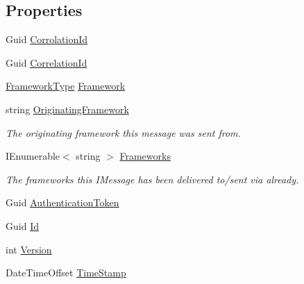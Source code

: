 \subsection*{Properties}
\begin{DoxyCompactItemize}
\item 
Guid \hyperlink{classCqrs_1_1Akka_1_1Tests_1_1Unit_1_1Events_1_1HelloWorldSaid_aa6b7af3e0cd38f63f65dd7d23e1ec628}{Corrolation\+Id}
\item 
Guid \hyperlink{classCqrs_1_1Akka_1_1Tests_1_1Unit_1_1Events_1_1HelloWorldSaid_a73d702957bb698206b0fd3a6ed3adf99}{Correlation\+Id}
\item 
\hyperlink{namespaceCqrs_1_1Messages_af06a7e6cd2609043d0f2f5f3419f81e3}{Framework\+Type} \hyperlink{classCqrs_1_1Akka_1_1Tests_1_1Unit_1_1Events_1_1HelloWorldSaid_aa16340777c04273f895c685ed5decb31}{Framework}
\item 
string \hyperlink{classCqrs_1_1Akka_1_1Tests_1_1Unit_1_1Events_1_1HelloWorldSaid_a41961069039f043e25d0d42ee05c2f2e}{Originating\+Framework}
\begin{DoxyCompactList}\small\item\em The originating framework this message was sent from. \end{DoxyCompactList}\item 
I\+Enumerable$<$ string $>$ \hyperlink{classCqrs_1_1Akka_1_1Tests_1_1Unit_1_1Events_1_1HelloWorldSaid_aa854587e4c732e87f4557b02166031fc}{Frameworks}
\begin{DoxyCompactList}\small\item\em The frameworks this I\+Message has been delivered to/sent via already. \end{DoxyCompactList}\item 
Guid \hyperlink{classCqrs_1_1Akka_1_1Tests_1_1Unit_1_1Events_1_1HelloWorldSaid_a22e519c1d838d43d06c8dc5ce820ce6f}{Authentication\+Token}
\item 
Guid \hyperlink{classCqrs_1_1Akka_1_1Tests_1_1Unit_1_1Events_1_1HelloWorldSaid_acb6e5f3f56de3edae8e022d19a2cbc09}{Id}
\item 
int \hyperlink{classCqrs_1_1Akka_1_1Tests_1_1Unit_1_1Events_1_1HelloWorldSaid_a31c7b70656767f90229171b579cba13c}{Version}
\item 
Date\+Time\+Offset \hyperlink{classCqrs_1_1Akka_1_1Tests_1_1Unit_1_1Events_1_1HelloWorldSaid_aa5025874b17575c910573f1ed6a70bc3}{Time\+Stamp}
\end{DoxyCompactItemize}



